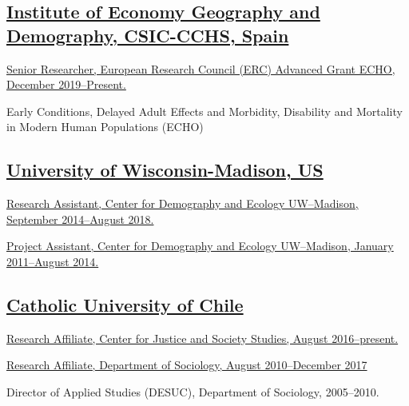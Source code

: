 \documentclass[10pt,letterpaper]{article}
\renewenvironment{itemize}{
  \begin{list}{}{
    \setlength{\leftmargin}{1.5em}
    \setlength{\itemsep}{0.25em}
    \setlength{\parskip}{0pt}
    \setlength{\parsep}{0.25em}
  }
}{
  \end{list}
}
\begin{document}
\subsection*{\href{http://iegd.csic.es/}{Institute of Economy Geography and Demography, CSIC-CCHS, Spain}}

\begin{itemize}
\item \href{https://echo-erc.csic.es/}{Senior Researcher, European Research Council (ERC) Advanced Grant ECHO, December 2019--Present.}
\item Early Conditions, Delayed Adult Effects and Morbidity, Disability and Mortality in Modern Human Populations (ECHO)
\end{itemize}

\subsection*{\href{http://www.ssc.wisc.edu}{University of Wisconsin-Madison, US}}

\begin{itemize}
\item \href{http://www.ssc.wisc.edu/cde/}{Research Assistant, Center for Demography and Ecology UW--Madison, September 2014--August 2018.}
\item \href{http://www.ssc.wisc.edu/cde/people/grads.php}{Project Assistant, Center for Demography and Ecology UW--Madison, January 2011--August 2014.}
\end{itemize}

\subsection*{\href{http://sociologia.uc.cl/}{Catholic University of Chile}}
 \begin{itemize}
 \item \href{http://justiciaysociedad.uc.cl/nosotros/investigadores-asociados}{Research Affiliate, Center for Justice and Society Studies, August 2016--present.}
 \item \href{http://sociologia.uc.cl/desuc}{Research Affiliate, Department of Sociology, August 2010--December 2017}
 \item Director of Applied Studies (DESUC), Department of Sociology, 2005--2010.
 \end{itemize}
\end{document}
